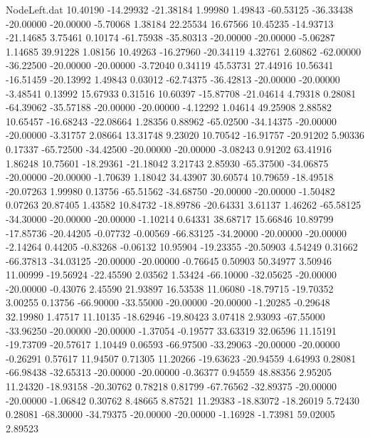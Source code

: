 \begin{filecontents}{NodeLeft.dat}
  10.40190  -14.29932  -21.38184     1.99980    1.49843  -60.53125  -36.33438  -20.00000  -20.00000   -5.70068    1.38184   22.25534   16.67566
  10.45235  -14.93713  -21.14685     3.75461    0.10174  -61.75938  -35.80313  -20.00000  -20.00000   -5.06287    1.14685   39.91228    1.08156
  10.49263  -16.27960  -20.34119     4.32761    2.60862  -62.00000  -36.22500  -20.00000  -20.00000   -3.72040    0.34119   45.53731   27.44916
  10.56341  -16.51459  -20.13992     1.49843    0.03012  -62.74375  -36.42813  -20.00000  -20.00000   -3.48541    0.13992   15.67933    0.31516
  10.60397  -15.87708  -21.04614     4.79318    0.28081  -64.39062  -35.57188  -20.00000  -20.00000   -4.12292    1.04614   49.25908    2.88582
  10.65457  -16.68243  -22.08664     1.28356    0.88962  -65.02500  -34.14375  -20.00000  -20.00000   -3.31757    2.08664   13.31748    9.23020
  10.70542  -16.91757  -20.91202     5.90336    0.17337  -65.72500  -34.42500  -20.00000  -20.00000   -3.08243    0.91202   63.41916    1.86248
  10.75601  -18.29361  -21.18042     3.21743    2.85930  -65.37500  -34.06875  -20.00000  -20.00000   -1.70639    1.18042   34.43907   30.60574
  10.79659  -18.49518  -20.07263     1.99980    0.13756  -65.51562  -34.68750  -20.00000  -20.00000   -1.50482    0.07263   20.87405    1.43582
  10.84732  -18.89786  -20.64331     3.61137    1.46262  -65.58125  -34.30000  -20.00000  -20.00000   -1.10214    0.64331   38.68717   15.66846
  10.89799  -17.85736  -20.44205    -0.07732   -0.00569  -66.83125  -34.20000  -20.00000  -20.00000   -2.14264    0.44205   -0.83268   -0.06132
  10.95904  -19.23355  -20.50903     4.54249    0.31662  -66.37813  -34.03125  -20.00000  -20.00000   -0.76645    0.50903   50.34977    3.50946
  11.00999  -19.56924  -22.45590     2.03562    1.53424  -66.10000  -32.05625  -20.00000  -20.00000   -0.43076    2.45590   21.93897   16.53538
  11.06080  -18.79715  -19.70352     3.00255    0.13756  -66.90000  -33.55000  -20.00000  -20.00000   -1.20285   -0.29648   32.19980    1.47517
  11.10135  -18.62946  -19.80423     3.07418    2.93093  -67.55000  -33.96250  -20.00000  -20.00000   -1.37054   -0.19577   33.63319   32.06596
  11.15191  -19.73709  -20.57617     1.10449    0.06593  -66.97500  -33.29063  -20.00000  -20.00000   -0.26291    0.57617   11.94507    0.71305
  11.20266  -19.63623  -20.94559     4.64993    0.28081  -66.98438  -32.65313  -20.00000  -20.00000   -0.36377    0.94559   48.88356    2.95205
  11.24320  -18.93158  -20.30762     0.78218    0.81799  -67.76562  -32.89375  -20.00000  -20.00000   -1.06842    0.30762    8.48665    8.87521
  11.29383  -18.83072  -18.26019     5.72430    0.28081  -68.30000  -34.79375  -20.00000  -20.00000   -1.16928   -1.73981   59.02005    2.89523

\end{filecontents}
